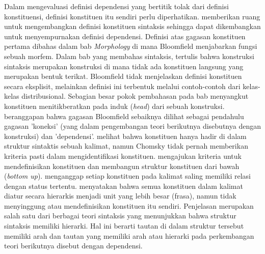 Dalam mengevaluasi definisi dependensi yang bertitik tolak dari definisi konstituensi, definisi konstituen itu sendiri perlu diperhatikan. \cite{bloomfield1933language} memberikan ruang untuk mengembangkan definisi konstituen sintaksis sehingga dapat dikembangkan untuk menyempurnakan definisi dependensi. Definisi \cite{bloomfield1933language} atas gagasan konstituen pertama dibahas dalam bab \textit{Morphology} di mana Bloomfield menjabarkan fungsi sebuah morfem. Dalam bab yang membahas sintaksis, tertulis bahwa konstruksi sintaksis merupakan konstruksi di mana tidak ada konstituen langsung yang merupakan bentuk terikat. Bloomfield tidak menjelaskan definisi konstituen secara eksplisit, melainkan definisi ini terbentuk melalui contoh-contoh dari kelas-kelas distribusional. Sebagian besar pokok pembahasan pada bab menyangkut konstituen menitikberatkan pada induk (\textit{head}) dari sebuah konstruksi. \cite{gerdes2013defining} beranggapan bahwa gagasan Bloomfield sebaiknya dilihat sebagai pendahulu gagasan 'koneksi' (yang dalam pengembangan teori berikutnya disebutnya dengan konstruksi) dan 'dependensi'. \cite{chomsky1986barriers} melihat bahwa konstituen hanya hadir di dalam struktur sintaktis sebuah kalimat, namun Chomsky tidak pernah memberikan kriteria pasti dalam mengidentifikasi konstituen. \cite{gleason1961introduction} mengajukan kriteria untuk mendefinisikan konstituen dan membangun struktur konstituen dari bawah (\textit{bottom up}). \cite{gleason1961introduction} menganggap setiap konstituen pada kalimat saling memiliki relasi dengan status tertentu. \cite{haegeman1994introduction} menyatakan bahwa semua konstituen dalam kalimat diatur secara hierarkis menjadi unit yang lebih besar (frasa), namun tidak menyinggung atau mendefinisikan konstituen itu sendiri. Penjelasan \cite{haegeman1994introduction} merupakan salah satu dari berbagai teori sintaksis yang menunjukkan bahwa struktur sintaksis memiliki hierarki. Hal ini berarti tautan di dalam struktur tersebut memiliki arah dan tautan yang memiliki arah atau hierarki pada perkembangan teori berikutnya disebut dengan  dependensi. 

